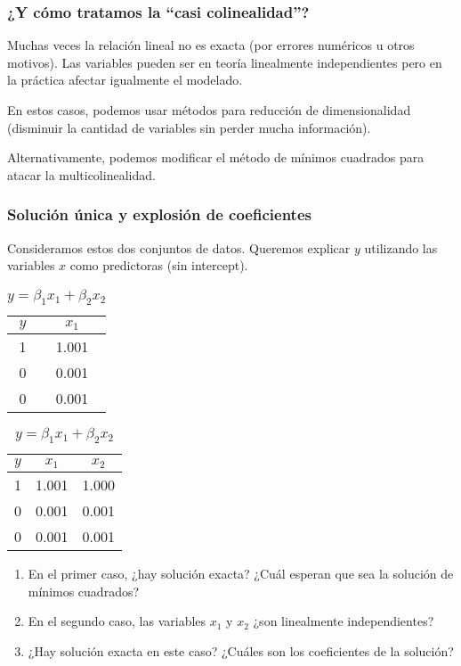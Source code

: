 \documentclass[aspectratio=169,12pt]{beamer}
\begin{document}
\begin{frame}
\frametitle{¿Y cómo tratamos la ``casi colinealidad''?}

Muchas veces la relación lineal no es exacta (por errores numéricos u otros motivos).
Las variables pueden ser en teoría linealmente independientes pero en la práctica afectar igualmente el modelado.

En estos casos, podemos usar métodos para reducción de dimensionalidad (disminuir la cantidad de variables sin perder mucha información).

Alternativamente, podemos modificar el método de mínimos cuadrados para atacar la multicolinealidad.

\end{frame}

\begin{frame}
\frametitle{Solución única y explosión de coeficientes}

Consideramos estos dos conjuntos de datos. Queremos explicar $y$ utilizando las variables $x$ como predictoras (sin intercept).

\begin{table}[htbp]
\centering
\begin{minipage}{.5\textwidth}
  \centering
  \caption{$y = \beta_1 x_1$}
  \begin{tabular}{cc}
    \hline
    \( y \) & \( x_1 \) \\
    \hline
    1 & 1.001 \\
    0 & 0.001 \\
    0 & 0.001 \\
    \hline
  \end{tabular}
\end{minipage}%
\begin{minipage}{.5\textwidth}
  \centering
  \caption{$y = \beta_1 x_1 + \beta_2 x_2$}
  \begin{tabular}{ccc}
    \hline
    \( y \) & \( x_1 \) & \( x_2 \) \\
    \hline
    1 & 1.001 & 1.000 \\
    0 & 0.001 & 0.001 \\
    0 & 0.001 & 0.001 \\
    \hline
  \end{tabular}
\end{minipage}
\end{table}

\begin{enumerate}
\item En el primer caso, ¿hay solución exacta? ¿Cuál esperan que sea la solución de mínimos cuadrados?
\item En el segundo caso, las variables $x_1$ y $x_2$ ¿son linealmente independientes?
\item ¿Hay solución exacta en este caso? ¿Cuáles son los coeficientes de la solución?
\end{enumerate}

\end{frame}
\end{document}
